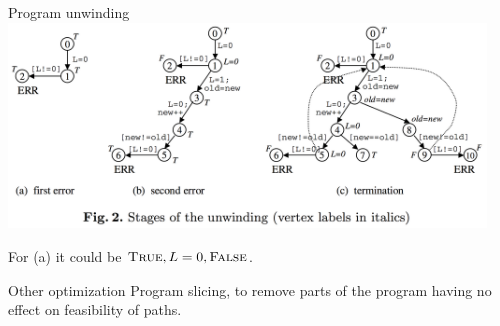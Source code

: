 \documentclass{beamer}
\begin{document}
\begin{frame}{Program unwinding}
  \includegraphics[width=0.95\textwidth]{interpolants_fig2.png}

  For (a) it could be $\textsc{True}, L=0, \textsc{False}$.
\end{frame}

\begin{frame}{Other optimization}
  Program slicing, to remove parts of the program having no effect on feasibility of paths.
\end{frame}



\end{document}
